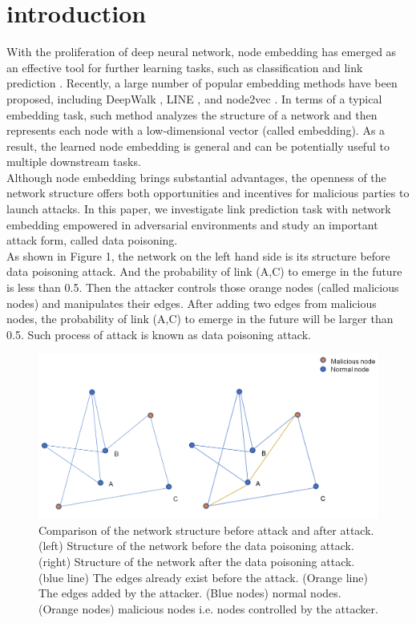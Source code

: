 \documentclass{acmtog} %
\begin{document}
\section{introduction}
With the proliferation of deep neural network, node embedding has emerged as an effective tool for further learning tasks, such as classification \cite{Deepwalk} and link prediction \cite{Node2vec}. Recently, a large number of popular embedding methods have been proposed, including DeepWalk \cite{Deepwalk}, LINE \cite{Line}, and node2vec \cite{Node2vec}. In terms of a typical embedding task, such method analyzes the structure of a network and then represents each node with a low-dimensional vector (called embedding). As a result, the learned node embedding is general and can be potentially useful to multiple downstream tasks.\\
\indent Although node embedding brings substantial advantages, the openness of the network structure offers both opportunities and incentives for malicious parties to launch attacks. In this paper, we investigate link prediction task with network embedding empowered in adversarial environments and study an important attack form, called data poisoning.\\
\indent As shown in Figure 1, the network on the left hand side is its structure before data poisoning attack. And the probability of link (A,C) to emerge in the future is less than 0.5. Then the attacker controls those orange nodes (called malicious nodes) and manipulates their edges. After adding two edges from malicious nodes, the probability of link (A,C) to emerge in the future will be larger than 0.5. Such process of attack is known as data poisoning attack. \\
\begin{figure}[t]
	\centerline{\includegraphics[width=13cm]{1.png}}
	\caption{Comparison of the network structure before attack and after attack. (left) Structure of the network before the data poisoning attack.(right) Structure of the network after the data poisoning attack. (blue line) The edges already exist before the attack. (Orange line) The edges added by the attacker. (Blue nodes) normal nodes. (Orange nodes) malicious nodes i.e. nodes controlled by the attacker.}
	\label{fig:videocomparison}
\end{figure}
\end{document}
